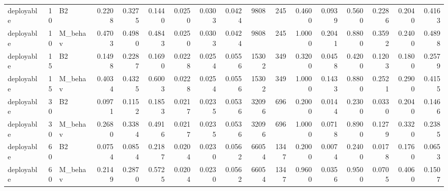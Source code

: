 \begin{table}
\begin{tabular}{lrlrrrrrrrrrrrrrr}
deployable & 10 & B2 & 0.2208 & 0.3275 & 0.1440 & 0.0250 & 0.0303 & 0.0424 & 9808 & 245 & 0.4600 & 0.0939 & 0.5600 & 0.2286 & 0.2040 & 0.4163 \\
deployable & 10 & M\_behav & 0.4703 & 0.4980 & 0.4843 & 0.0250 & 0.0303 & 0.0424 & 9808 & 245 & 1.0000 & 0.2041 & 0.8800 & 0.3592 & 0.2400 & 0.4898 \\
deployable & 15 & B2 & 0.1498 & 0.2287 & 0.1690 & 0.0228 & 0.0254 & 0.0556 & 15302 & 349 & 0.3200 & 0.0458 & 0.4200 & 0.1203 & 0.1800 & 0.2579 \\
deployable & 15 & M\_behav & 0.4034 & 0.4325 & 0.6003 & 0.0228 & 0.0254 & 0.0556 & 15302 & 349 & 1.0000 & 0.1433 & 0.8800 & 0.2521 & 0.2900 & 0.4155 \\
deployable & 30 & B2 & 0.0971 & 0.1152 & 0.1853 & 0.0217 & 0.0235 & 0.0536 & 32096 & 696 & 0.2000 & 0.0144 & 0.2300 & 0.0330 & 0.2040 & 0.1466 \\
deployable & 30 & M\_behav & 0.2680 & 0.3384 & 0.4916 & 0.0217 & 0.0235 & 0.0536 & 32096 & 696 & 1.0000 & 0.0718 & 0.8900 & 0.1279 & 0.3320 & 0.2385 \\
deployable & 60 & B2 & 0.0754 & 0.0854 & 0.2187 & 0.0204 & 0.0230 & 0.0562 & 66054 & 1347 & 0.2000 & 0.0074 & 0.2400 & 0.0178 & 0.1760 & 0.0653 \\
deployable & 60 & M\_behav & 0.2149 & 0.2870 & 0.5725 & 0.0204 & 0.0230 & 0.0562 & 66054 & 1347 & 0.9600 & 0.0356 & 0.9500 & 0.0705 & 0.4060 & 0.1507 \\
\bottomrule
\end{tabular}
\end{table}
